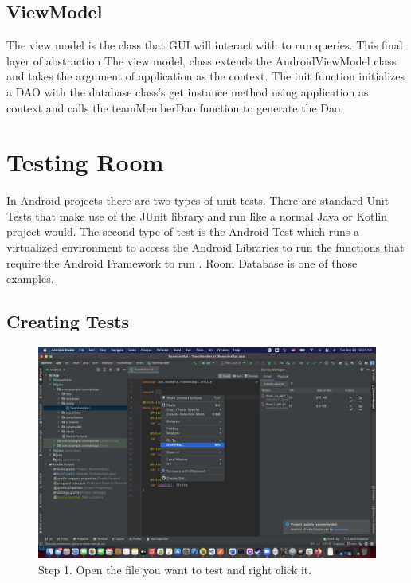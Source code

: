 \documentclass[12pt]{article}
\begin{document}
\subsection{ViewModel}

The view model is the class that GUI will interact with to run queries. This final layer of abstraction 
The view model, class extends the AndroidViewModel class and takes the argument of application as the context. The init function initializes a DAO with the database class's get instance method using application as context and calls the teamMemberDao function to generate the Dao. 

\section{Testing Room}
In Android projects there are two types of unit tests. There are standard Unit Tests that make use of the JUnit library and run like a normal Java or Kotlin project would. The second type of test is the Android  Test which runs a virtualized environment to access the Android Libraries to run the functions that require the Android Framework to run \cite{AndroidTestingFundamentals}. Room Database is one of those examples. 

\subsection{Creating Tests}

\begin{figure}[H]
    \centering
    \includegraphics[trim=10 10 10 50, clip, width=\textwidth] {images/testing/1_rightClick.png}
    \caption{Step 1. Open the file you want to test and right click it.}
    \label{fig:test_step_1}
\end{figure}
\end{document}
